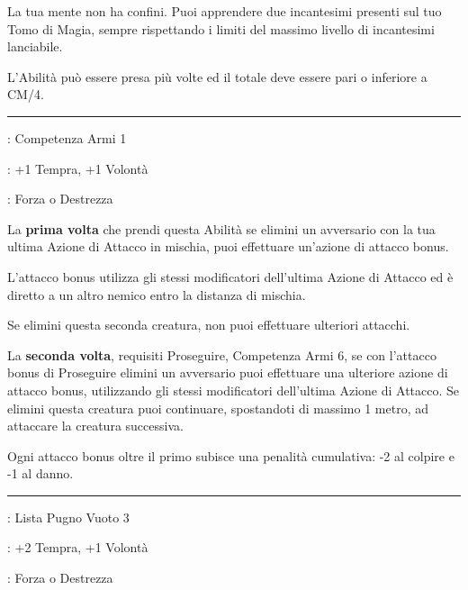 \begin{multicols}{2}
La tua mente non ha confini. Puoi apprendere due incantesimi presenti sul tuo Tomo di Magia, sempre rispettando i limiti del massimo livello di incantesimi lanciabile.

L'Abilità può essere presa più volte ed il totale deve essere pari o inferiore a CM/4.

\smallskip\noindent\rule{\linewidth}{2pt} \hypertarget{Proseguire}{}\medskip{}
\noindent
\begin{description}[noitemsep, topsep=0pt, parsep=0pt, partopsep=0pt, leftmargin=0cm, labelwidth=2.5cm]
    \item[\textbf{Requisito}]: Competenza Armi 1
    \item[\textbf{Tiri Salvezza}]: +1 Tempra, +1 Volontà
    \item[\textbf{Caratteristica}]: Forza o Destrezza
\end{description}

La \textbf{prima volta} che prendi questa Abilità se elimini un avversario con la tua ultima Azione di Attacco in mischia, puoi effettuare un'azione di attacco bonus.

L'attacco bonus utilizza gli stessi modificatori dell'ultima Azione di Attacco ed è diretto a un altro nemico entro la distanza di mischia.

Se elimini questa seconda creatura, non puoi effettuare ulteriori attacchi.

La \textbf{seconda volta}, requisiti Proseguire, Competenza Armi 6, se con l'attacco bonus di Proseguire elimini un avversario puoi effettuare una ulteriore azione di attacco bonus, utilizzando gli stessi modificatori dell'ultima Azione di Attacco. Se elimini questa creatura puoi continuare, spostandoti di massimo 1 metro, ad attaccare la creatura successiva.

Ogni attacco bonus oltre il primo subisce una penalità cumulativa: -2 al colpire e -1 al danno.

\smallskip\noindent\rule{\linewidth}{2pt} \hypertarget{Pugno di Ferro}{}\medskip{}
\noindent
\begin{description}[noitemsep, topsep=0pt, parsep=0pt, partopsep=0pt, leftmargin=0cm, labelwidth=2.5cm]
    \item[\textbf{Requisito}]: Lista Pugno Vuoto 3
    \item[\textbf{Tiri Salvezza}]: +2 Tempra, +1 Volontà
    \item[\textbf{Caratteristica}]: Forza o Destrezza
\end{description}


\end{multicols}

